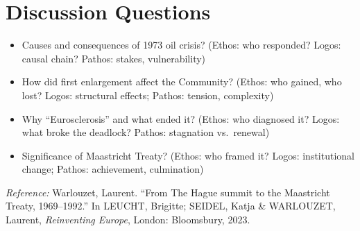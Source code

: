 \documentclass[11pt,a4paper]{article}
\begin{document}
\section*{Discussion Questions}

\begin{itemize}
\item Causes and consequences of 1973 oil crisis? (Ethos: who responded? Logos: causal chain? Pathos: stakes, vulnerability)
\item How did first enlargement affect the Community? (Ethos: who gained, who lost? Logos: structural effects; Pathos: tension, complexity)
\item Why ``Eurosclerosis'' and what ended it? (Ethos: who diagnosed it? Logos: what broke the deadlock? Pathos: stagnation vs.\ renewal)
\item Significance of Maastricht Treaty? (Ethos: who framed it? Logos: institutional change; Pathos: achievement, culmination)
\end{itemize}

\vspace{1em}
\noindent\footnotesize\textit{Reference:} Warlouzet, Laurent. ``From The Hague summit to the Maastricht Treaty, 1969--1992.'' In LEUCHT, Brigitte; SEIDEL, Katja \& WARLOUZET, Laurent, \textit{Reinventing Europe}, London: Bloomsbury, 2023.
\end{document}
